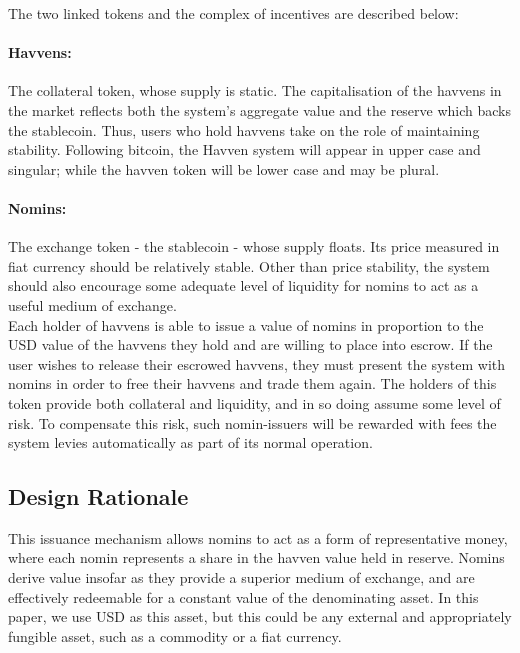 \noindent The two linked tokens and the complex of incentives are described below:

\paragraph{Havvens:} The collateral token, whose supply is static.
The capitalisation of the havvens in the market reflects both the system's aggregate value and the reserve
which backs the stablecoin. Thus, users who hold havvens take on the role of maintaining stability.
Following bitcoin, the Havven system will appear in upper case and singular; while the havven token will be lower case and may be plural.

\paragraph{Nomins:} The exchange token - the stablecoin - whose supply floats. Its price measured in fiat currency should be relatively stable.
Other than price stability, the system should also encourage some adequate level of liquidity for nomins
to act as a useful medium of exchange. \\

\noindent Each holder of havvens is able to issue a value of nomins in proportion to the USD value
of the havvens they hold and are willing to place into escrow. If the user wishes to release their escrowed havvens, they must
present the system with nomins in order to free their havvens and trade them again.
The holders of this token provide both collateral and liquidity, and in so doing assume some
level of risk. To compensate this risk, such nomin-issuers will be rewarded with fees the system levies
automatically as part of its normal operation. \\

\subsection{Design Rationale}

\noindent This issuance mechanism allows nomins to act as a form of representative money, where 
each nomin represents a share in the havven value held in reserve. Nomins derive value insofar as they provide
a superior medium of exchange, and are effectively redeemable for a constant value
of the denominating asset. In this paper, we use USD as this asset, but this could be any external
and appropriately fungible asset, such as a commodity or a fiat currency.  \\

